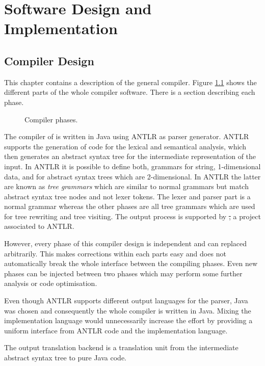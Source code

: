 \chapter{Software Design and Implementation}
\label{ctr:swDesignImplementation}

\section{Compiler Design}
This chapter contains a description of the general compiler. Figure
\ref{fig:compilerPhase} shows the different parts of the whole compiler
software. There is a section describing each phase.

\begin{figure}[ht]
	\centerline{}
	\caption{Compiler phases.}
	\label{fig:compilerPhase}
\end{figure}

The compiler of \ooplss is written in Java using ANTLR as parser
generator. ANTLR supports the generation of code for the lexical and
semantical analysis, which then generates an abstract syntax tree for
the intermediate representation of the input. In ANTLR it is possible to
define both, grammars for string, 1-dimensional data, and for abstract syntax
trees which are 2-dimensional. In ANTLR the latter are known as \emph{tree
grammars} which are similar to normal grammars but match abstract
syntax tree nodes and not lexer tokens. The lexer and parser part is a
normal grammar whereas the other phases are all tree grammars which are
used for tree rewriting and tree visiting. The output process
is supported by \st, a project associated to ANTLR.

However, every phase of this compiler design is independent and can
replaced arbitrarily. This makes corrections within each parts easy and
does not automatically break the whole interface between the compiling
phases. Even new phases can be injected between two phases which may
perform some further analysis or code optimisation.

Even though ANTLR supports different output languages for the parser, Java was
chosen and consequently the whole compiler is written in Java. Mixing
the implementation language would unnecessarily increase the effort
by providing a uniform interface from ANTLR code and the implementation
language.

The output translation backend is a translation unit from the
intermediate abstract syntax tree to pure Java code.

